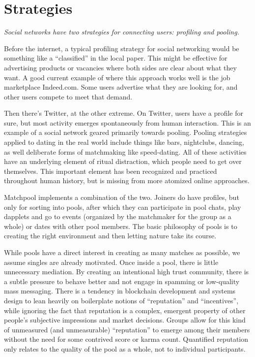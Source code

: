 \documentclass[a4paper]{article}
\begin{document}
\section{Strategies}

\textit{Social networks have two strategies for connecting users: profiling and pooling.}

Before the internet, a typical profiling strategy for social networking would be something like a “classified” in the local paper. This might be effective for advertising products or vacancies where both sides are clear about what they want. A good current example of where this approach works well is the job marketplace Indeed.com. Some users advertise what they are looking for, and other users compete to meet that demand.

Then there's Twitter, at the other extreme. On Twitter, users have a profile for sure, but most activity emerges spontaneously from human interaction. This is an example of a social network geared primarily towards pooling. Pooling strategies applied to dating in the real world include things like bars, nightclubs, dancing, as well deliberate forms of matchmaking like speed-dating. All of these activities have an underlying element of ritual distraction, which people need to get over themselves. This important element has been recognized and practiced throughout human history, but is missing from more atomized online approaches.

Matchpool implements a combination of the two. Joiners do have profiles, but only for sorting into pools, after which they can participate in pool chats, play dapplets and go to events (organized by the matchmaker for the group as a whole) or dates with other pool members. The basic philosophy of pools is to creating the right environment and then letting nature take its course.

While pools have a direct interest in creating as many matches as possible, we assume singles are already motivated. Once inside a pool, there is little unnecessary mediation. By creating an intentional high trust community, there is a subtle pressure to behave better and not engage in spamming or low-quality mass messaging. There is a tendency in blockchain development and systems design to lean heavily on boilerplate notions of “reputation” and “incentives”, while ignoring the fact that reputation is a complex, emergent property of other people's subjective impressions and market decisions. Groups allow for this kind of unmeasured (and unmeasurable) “reputation” to emerge among their members without the need for some contrived score or karma count. Quantified reputation only relates to the quality of the pool as a whole, not to individual participants.
\end{document}
